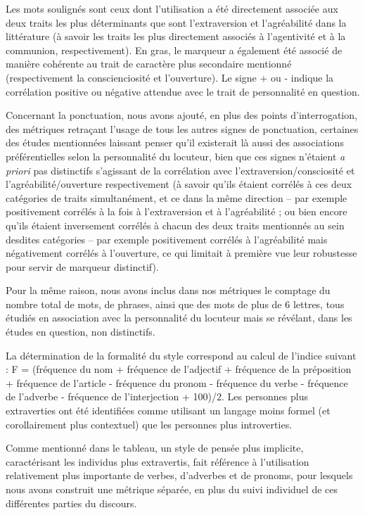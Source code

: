 \vspace{-20pt} %

Les mots soulignés sont ceux dont l'utilisation a été directement associée aux deux traits les plus déterminants que sont l'extraversion et l'agréabilité dans la littérature (à savoir les traits les plus directement associés à l’agentivité et à la communion, respectivement). En gras, le marqueur a également été associé de manière cohérente au trait de caractère plus secondaire mentionné (respectivement la conscienciosité et l'ouverture). Le signe + ou - indique la corrélation positive ou négative attendue avec le trait de personnalité en question.

Concernant la ponctuation, nous avons ajouté, en plus des points d’interrogation, des métriques retraçant l’usage de tous les autres signes de ponctuation, certaines des études mentionnées laissant penser qu’il existerait là aussi des associations préférentielles selon la personnalité du locuteur, bien que ces signes n’étaient \textit{a priori} pas distinctifs s’agissant de la corrélation avec l’extraversion/consciosité et l’agréabilité/ouverture respectivement (à savoir qu’ils étaient corrélés à ces deux catégories de traits simultanément, et ce dans la même direction – par exemple positivement corrélés à la fois à l’extraversion et à l’agréabilité ; ou bien encore qu’ils étaient inversement corrélés à chacun des deux traits mentionnés au sein desdites catégories – par exemple positivement corrélés à l’agréabilité mais négativement corrélés à l’ouverture, ce qui limitait à première vue leur robustesse pour servir de marqueur distinctif). 

Pour la même raison, nous avons inclus dans nos métriques le comptage du nombre total de mots, de phrases, ainsi que des mots de plus de 6 lettres, tous étudiés en association avec la personnalité du locuteur mais se révélant, dans les études en question, non distinctifs.

La détermination de la formalité du style correspond au calcul de l'indice suivant : F = (fréquence du nom + fréquence de l'adjectif + fréquence de la préposition + fréquence de l'article - fréquence du pronom - fréquence du verbe - fréquence de l'adverbe - fréquence de l'interjection + 100)/2. Les personnes plus extraverties ont été identifiées comme utilisant un langage moins formel (et corollairement plus contextuel) que les personnes plus introverties.

Comme mentionné dans le tableau, un style de pensée plus implicite, caractérisant les individus plus extravertis, fait référence à l'utilisation relativement plus importante de verbes, d'adverbes et de pronoms, pour lesquels nous avons construit une métrique séparée, en plus du suivi individuel de ces différentes parties du discours.

